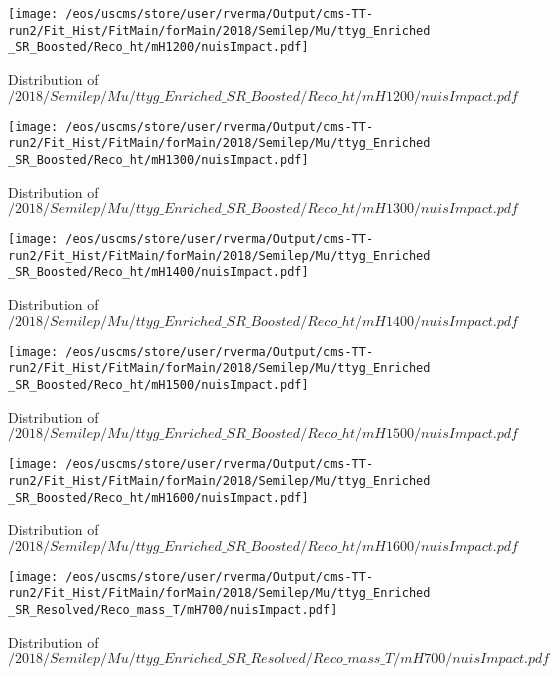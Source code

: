 \begin{figure}
\centering
\texttt{[image: /eos/uscms/store/user/rverma/Output/cms-TT-run2/Fit\_Hist/FitMain/forMain/2018/Semilep/Mu/ttyg\_Enriched\_SR\_Boosted/Reco\_ht/mH1200/nuisImpact.pdf]}
\caption{Distribution of $/2018/Semilep/Mu/ttyg\_Enriched\_SR\_Boosted/Reco\_ht/mH1200/nuisImpact.pdf$}
\end{figure}

\begin{figure}
\centering
\texttt{[image: /eos/uscms/store/user/rverma/Output/cms-TT-run2/Fit\_Hist/FitMain/forMain/2018/Semilep/Mu/ttyg\_Enriched\_SR\_Boosted/Reco\_ht/mH1300/nuisImpact.pdf]}
\caption{Distribution of $/2018/Semilep/Mu/ttyg\_Enriched\_SR\_Boosted/Reco\_ht/mH1300/nuisImpact.pdf$}
\end{figure}

\begin{figure}
\centering
\texttt{[image: /eos/uscms/store/user/rverma/Output/cms-TT-run2/Fit\_Hist/FitMain/forMain/2018/Semilep/Mu/ttyg\_Enriched\_SR\_Boosted/Reco\_ht/mH1400/nuisImpact.pdf]}
\caption{Distribution of $/2018/Semilep/Mu/ttyg\_Enriched\_SR\_Boosted/Reco\_ht/mH1400/nuisImpact.pdf$}
\end{figure}

\begin{figure}
\centering
\texttt{[image: /eos/uscms/store/user/rverma/Output/cms-TT-run2/Fit\_Hist/FitMain/forMain/2018/Semilep/Mu/ttyg\_Enriched\_SR\_Boosted/Reco\_ht/mH1500/nuisImpact.pdf]}
\caption{Distribution of $/2018/Semilep/Mu/ttyg\_Enriched\_SR\_Boosted/Reco\_ht/mH1500/nuisImpact.pdf$}
\end{figure}

\begin{figure}
\centering
\texttt{[image: /eos/uscms/store/user/rverma/Output/cms-TT-run2/Fit\_Hist/FitMain/forMain/2018/Semilep/Mu/ttyg\_Enriched\_SR\_Boosted/Reco\_ht/mH1600/nuisImpact.pdf]}
\caption{Distribution of $/2018/Semilep/Mu/ttyg\_Enriched\_SR\_Boosted/Reco\_ht/mH1600/nuisImpact.pdf$}
\end{figure}

\begin{figure}
\centering
\texttt{[image: /eos/uscms/store/user/rverma/Output/cms-TT-run2/Fit\_Hist/FitMain/forMain/2018/Semilep/Mu/ttyg\_Enriched\_SR\_Resolved/Reco\_mass\_T/mH700/nuisImpact.pdf]}
\caption{Distribution of $/2018/Semilep/Mu/ttyg\_Enriched\_SR\_Resolved/Reco\_mass\_T/mH700/nuisImpact.pdf$}
\end{figure}

